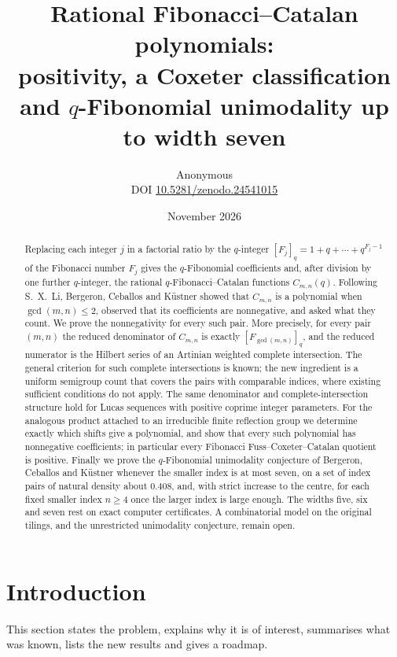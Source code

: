 \documentclass[11pt,a4paper]{article}
\title{Rational Fibonacci--Catalan polynomials:\\ positivity, a Coxeter classification\\ and $q$-Fibonomial unimodality up to width seven}
\author{Anonymous\\[3pt]{\small DOI \href{https://doi.org/10.5281/zenodo.24541015}{10.5281/zenodo.24541015}}}
\date{November 2026}
\theoremstyle{definition}\newtheorem{definition}[theorem]{Definition}
\theoremstyle{remark}\newtheorem{remark}[theorem]{Remark}\newtheorem{example}[theorem]{Example}
\numberwithin{equation}{section}
\begin{document}
\maketitle
\begin{abstract}
Replacing each integer $j$ in a factorial ratio by the $q$-integer $[F_j]_q=1+q+\cdots+q^{F_j-1}$ of the Fibonacci number $F_j$ gives the $q$-Fibonomial coefficients and, after division by one further $q$-integer, the rational $q$-Fibonacci--Catalan functions $C_{m,n}(q)$. Following S.~X.~Li, Bergeron, Ceballos and K\"ustner showed that $C_{m,n}$ is a polynomial when $\gcd(m,n)\le2$, observed that its coefficients are nonnegative, and asked what they count. We prove the nonnegativity for every such pair. More precisely, for every pair $(m,n)$ the reduced denominator of $C_{m,n}$ is exactly $[F_{\gcd(m,n)}]_q$, and the reduced numerator is the Hilbert series of an Artinian weighted complete intersection. The general criterion for such complete intersections is known; the new ingredient is a uniform semigroup count that covers the pairs with comparable indices, where existing sufficient conditions do not apply. The same denominator and complete-intersection structure hold for Lucas sequences with positive coprime integer parameters. For the analogous product attached to an irreducible finite reflection group we determine exactly which shifts give a polynomial, and show that every such polynomial has nonnegative coefficients; in particular every Fibonacci Fuss--Coxeter--Catalan quotient is positive. Finally we prove the $q$-Fibonomial unimodality conjecture of Bergeron, Ceballos and K\"ustner whenever the smaller index is at most seven, on a set of index pairs of natural density about $0.408$, and, with strict increase to the centre, for each fixed smaller index $n\ge4$ once the larger index is large enough. The widths five, six and seven rest on exact computer certificates. A combinatorial model on the original tilings, and the unrestricted unimodality conjecture, remain open.
\end{abstract}

\section{Introduction}\label{sec:intro}
This section states the problem, explains why it is of interest, summarises what was known, lists the new results and gives a roadmap.
\end{document}
